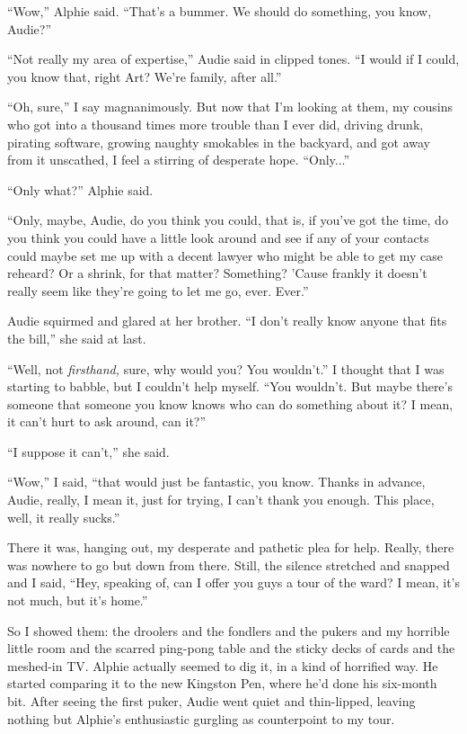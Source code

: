 “Wow,” Alphie said. “That’s a bummer. We should do something, you
know, Audie?”

“Not really my area of expertise,” Audie said in clipped tones. “I
would if I could, you know that, right Art? We’re family, after
all.”

“Oh, sure,” I say magnanimously. But now that I’m looking at them,
my cousins who got into a thousand times more trouble than I ever
did, driving drunk, pirating software, growing naughty smokables in
the backyard, and got away from it unscathed, I feel a stirring of
desperate hope. “Only...”

“Only what?” Alphie said.

“Only, maybe, Audie, do you think you could, that is, if you’ve got
the time, do you think you could have a little look around and see
if any of your contacts could maybe set me up with a decent lawyer
who might be able to get my case reheard? Or a shrink, for that
matter? Something? ’Cause frankly it doesn’t really seem like
they’re going to let me go, ever. Ever.”

Audie squirmed and glared at her brother. “I don’t really know
anyone that fits the bill,” she said at last.

“Well, not \emph{firsthand,} sure, why would you? You wouldn’t.” I
thought that I was starting to babble, but I couldn’t help myself.
“You wouldn’t. But maybe there’s someone that someone you know
knows who can do something about it? I mean, it can’t hurt to ask
around, can it?”

“I suppose it can’t,” she said.

“Wow,” I said, “that would just be fantastic, you know. Thanks in
advance, Audie, really, I mean it, just for trying, I can’t thank
you enough. This place, well, it really sucks.”

There it was, hanging out, my desperate and pathetic plea for help.
Really, there was nowhere to go but down from there. Still, the
silence stretched and snapped and I said, “Hey, speaking of, can I
offer you guys a tour of the ward? I mean, it’s not much, but it’s
home.”

So I showed them: the droolers and the fondlers and the pukers and
my horrible little room and the scarred ping-pong table and the
sticky decks of cards and the meshed-in TV. Alphie actually seemed
to dig it, in a kind of horrified way. He started comparing it to
the new Kingston Pen, where he’d done his six-month bit. After
seeing the first puker, Audie went quiet and thin-lipped, leaving
nothing but Alphie’s enthusiastic gurgling as counterpoint to my
tour.

